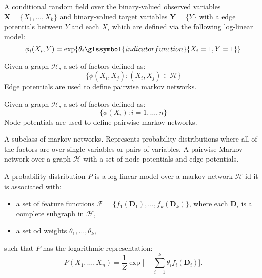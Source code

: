 {%
  A \gls{conditional random field} over the binary-valued \glspl{observed variable} $\bm{X}=\{X_1,\dots,X_k\}$ and binary-valued \glspl{target variable} $\bm{Y}=\{Y\}$ with a \glspl{edge potential} between $Y$ and each $X_i$ which are defined via the following \gls{log-linear model}:
  \begin{equation*}
    \phi_i(X_i,Y)=\exp\{ \theta_i \glssymbol{indicator function} \{ X_i=1,Y=1\}\}
  \end{equation*}
}

{%
  Given a \gls{graph} $\mathcal{H}$, a set of \glspl{factor} defined as:
  \begin{equation*}
    \{\phi(X_i,X_j):(X_i,X_j)\in\mathcal{H}\}
  \end{equation*}
  Edge potentials are used to define \glspl{pairwise markov network}.

}

{%
  Given a \gls{graph} $\mathcal{H}$, a set of \glspl{factor} defined as:
  \begin{equation*}
    \{\phi(X_i):i=1,\dots,n\}
  \end{equation*}
  Node potentials are used to define \glspl{pairwise markov network}.
}

{%
  A subclass of \glspl{markov network}. Represents \glspl{probability distribution} where all of the \glspl{factor} are over single variables or pairs of variables. A pairwise Markov network over a graph $\mathcal{H}$ with a set of \glspl{node potential} and \glspl{edge potential}.
}

{%
  A \gls{probability distribution} $P$ is a log-linear model over a \gls{markov network} $\mathcal{H}$ id it is associated with:
  \begin{itemize}
    \item a set of \glspl{feature function} $\mathcal{F}=\{f_1(\bm{D}_1),\dots,f_k(\bm{D}_k)\}$, where each $\bm{D}_i$ is a \gls{complete subgraph} in $\mathcal{H}$,
    \item a set od weights $\theta_1,\dots,\theta_k$,
  \end{itemize}
  such that $P$ has the \gls{logarithmic representation}:
  \begin{equation*}
    P(X_1,\dots,X_n)=\frac{1}{Z}\exp \Bigg[ -\sum_{i=1}^k \theta_i f_i(\bm{D}_i) \Bigg].
  \end{equation*}
}

